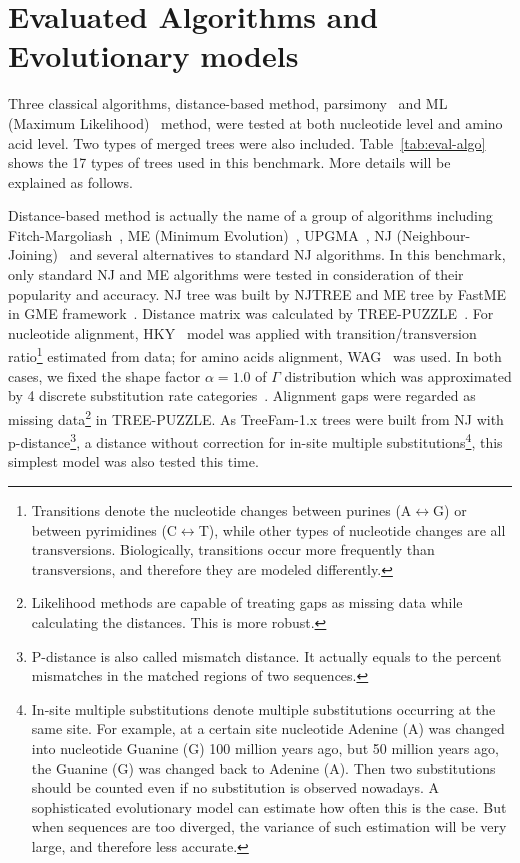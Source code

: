 \section{Evaluated Algorithms and Evolutionary models}

Three classical algorithms,
distance-based method,
parsimony~\cite{fitch71} and
ML (Maximum Likelihood)~\cite{felsenstein81} method,
were tested at both nucleotide level and amino acid level. Two types of merged trees were also
included. Table~\ref{tab:eval-algo} shows the 17 types of trees
used in this benchmark. More details will be explained as follows.

Distance-based method is actually the name of a group of algorithms including
Fitch-Margoliash~\cite{fitch67},
ME (Minimum Evolution)~\cite{rzhetsky93},
UPGMA~\cite{sokal58},
NJ (Neighbour-Joining)~\cite{saitou87}
and several alternatives to standard NJ algorithms. In this benchmark, only standard NJ and ME
algorithms were tested in consideration of their popularity and accuracy.
NJ tree was built by NJTREE and ME tree by FastME in GME framework~\cite{desper04}.
Distance matrix was calculated by TREE-PUZZLE~\cite{schmidt02}.
For nucleotide alignment, HKY~\cite{hasegawa85} model was applied with
transition/transversion ratio\footnote{Transitions denote the nucleotide changes between purines
(A$\leftrightarrow$G) or between pyrimidines (C$\leftrightarrow$T),
while other types of nucleotide changes are all transversions. Biologically, transitions occur more frequently
than transversions, and therefore they are modeled differently.} estimated from data; for amino acids alignment,
WAG~\cite{whelan01}
was used. In both cases, we fixed the shape factor $\alpha=1.0$ of $\Gamma$ distribution
which was approximated by 4 discrete substitution rate categories~\cite{yang94}. Alignment gaps
were regarded as missing data\footnote{Likelihood methods are capable of treating gaps as missing data
while calculating the distances. This is more robust.} in TREE-PUZZLE. As TreeFam-1.x trees were built from NJ with
p-distance\footnote{P-distance is also called mismatch distance. It actually equals to
the percent mismatches in the matched regions of two sequences.},
a distance without correction for in-site multiple substitutions\footnote{In-site multiple
substitutions denote multiple substitutions occurring at the same site.
For example, at a certain site nucleotide Adenine (A) was changed into nucleotide Guanine (G) 100 million years ago,
but 50 million years ago, the Guanine (G) was changed back to Adenine (A). Then two substitutions should be
counted even if no substitution is observed nowadays. A sophisticated evolutionary model can estimate how
often this is the case. But when sequences are too diverged, the variance of such estimation will be very large,
and therefore less accurate.}, this simplest model was also tested this time.

